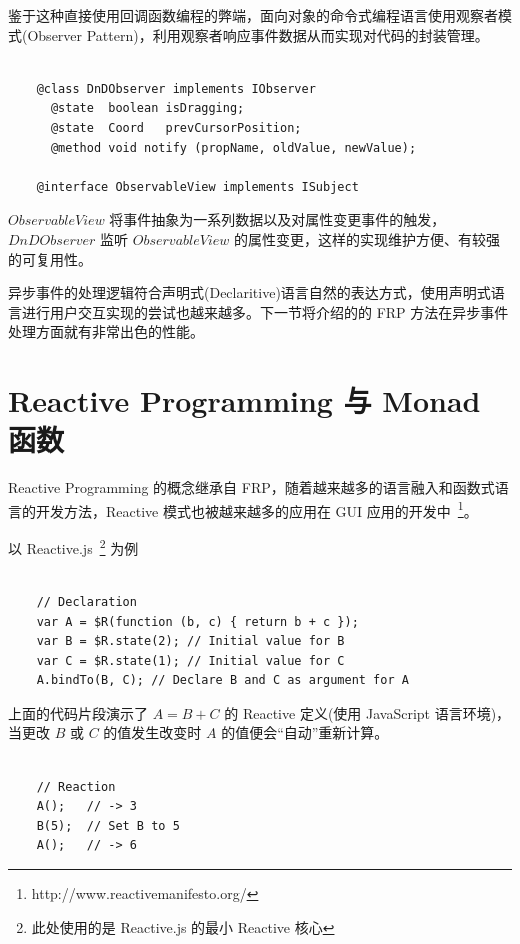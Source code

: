 鉴于这种直接使用回调函数编程的弊端，面向对象的命令式编程语言使用观察者模式(Observer Pattern)，利用观察者响应事件数据从而实现对代码的封装管理。

\begin{verbatim}

    @class DnDObserver implements IObserver
      @state  boolean isDragging;
      @state  Coord   prevCursorPosition;
      @method void notify (propName, oldValue, newValue);

    @interface ObservableView implements ISubject

\end{verbatim}

$ObservableView$ 将事件抽象为一系列数据以及对属性变更事件的触发，$DnDObserver$ 监听 $ObservableView$ 的属性变更，这样的实现维护方便、有较强的可复用性。

异步事件的处理逻辑符合声明式(Declaritive)语言自然的表达方式，使用声明式语言进行用户交互实现的尝试也越来越多。下一节将介绍的的 FRP 方法在异步事件处理方面就有非常出色的性能。

\section{Reactive Programming 与 Monad 函数}

Reactive Programming 的概念继承自 FRP，随着越来越多的语言融入和函数式语言的开发方法，Reactive 模式也被越来越多的应用在 GUI 应用的开发中~\footnote{http://www.reactivemanifesto.org/}。

以 Reactive.js~\footnote{此处使用的是 Reactive.js 的最小 Reactive 核心} 为例~\cite{Carkci2013}

\begin{verbatim}

    // Declaration
    var A = $R(function (b, c) { return b + c });
    var B = $R.state(2); // Initial value for B
    var C = $R.state(1); // Initial value for C
    A.bindTo(B, C); // Declare B and C as argument for A

\end{verbatim}

上面的代码片段演示了 $A = B + C$ 的 Reactive 定义(使用 JavaScript 语言环境)，当更改 $B$ 或 $C$ 的值发生改变时 $A$ 的值便会“自动”重新计算。

\begin{verbatim}

    // Reaction
    A();   // -> 3
    B(5);  // Set B to 5
    A();   // -> 6

\end{verbatim}

